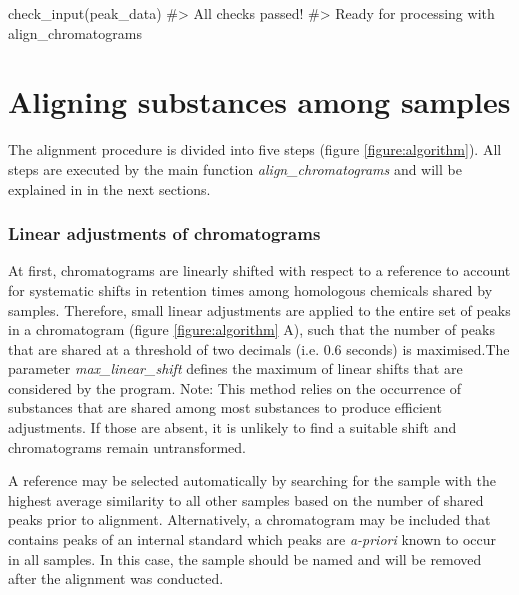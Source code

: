 \begin{example}
check_input(peak_data)
#> All checks passed!
#> Ready for processing with align_chromatograms
\end{example}

\section{Aligning substances among samples}
The alignment procedure is divided into five steps (figure \ref{figure:algorithm}). All steps are executed by the main function \textit{align{\_}chromatograms} and will be explained in in the next sections.
\subsubsection{Linear adjustments of chromatograms}
At first, chromatograms are linearly shifted with respect to a reference to account for systematic shifts in retention times among homologous chemicals shared by samples. Therefore, small linear adjustments are applied to the entire set of peaks in a chromatogram (figure \ref{figure:algorithm} A), such that the number of peaks that are shared at a threshold of two decimals (i.e. 0.6 seconds) is maximised.The parameter \textit{max{\_}linear{\_}shift} defines the maximum of linear shifts that are considered by the program. \newline
Note: This method relies on the occurrence of substances that are shared among most substances to produce efficient adjustments. If those are absent, it is unlikely to find a suitable shift and chromatograms remain untransformed. \par
A reference may be selected automatically by searching for the sample with the highest average similarity to all other samples based on the number of shared peaks prior to alignment. Alternatively, a chromatogram may be included that contains peaks of an internal standard which peaks are \textit{a-priori} known to occur in all samples. In this case, the sample should be named  and will be removed after the alignment was conducted.

